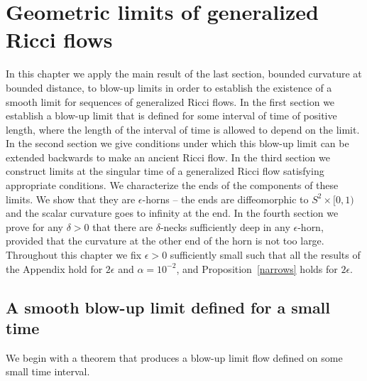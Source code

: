 \chapter{Geometric limits of generalized Ricci flows}
\label{chap:geometric-limits}

In this chapter we apply the main result of the last section,
bounded curvature at bounded distance, to blow-up limits in order to
establish the existence of a smooth limit for sequences of
generalized Ricci flows. In the first section we establish a blow-up
limit that is defined for some interval of time of positive length,
where the length of the interval of time is allowed to depend on the
limit. In the second section we give conditions under which this
blow-up limit can be extended backwards to make an ancient Ricci
flow. In the third section we construct limits at the singular time
of a generalized Ricci flow satisfying appropriate conditions. We
characterize the ends of the components of these limits. We show
that they are $\epsilon$-horns -- the ends are diffeomorphic to
$S^2\times [0,1)$ and the scalar curvature goes to infinity at the
end. In the fourth section we prove  for any $\delta>0$  that there
are $\delta$-necks sufficiently deep in any $\epsilon$-horn,
provided that the curvature at the other end of the horn is not too
large. Throughout this chapter we fix $\epsilon>0$ sufficiently
small such that all the results of the Appendix hold for $2\epsilon$
and $\alpha=10^{-2}$, and Proposition~\ref{narrows} holds for
$2\epsilon$.


\section{A smooth blow-up limit defined for a small time}


We begin with a theorem that produces a blow-up limit flow defined
on some small time interval.

